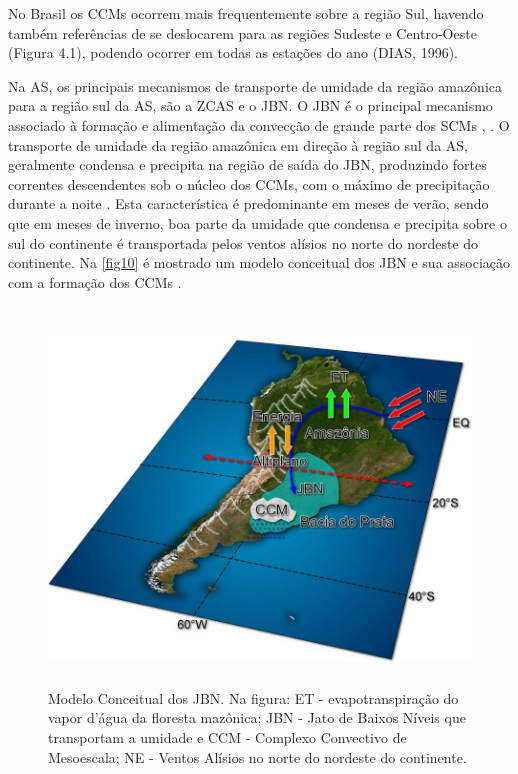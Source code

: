 No Brasil os CCMs ocorrem mais frequentemente sobre a região Sul, havendo também referências de se deslocarem para as regiões Sudeste e Centro-Oeste (Figura 4.1), podendo ocorrer em todas as estações do ano (DIAS, 1996).

Na AS, os principais mecanismos de transporte de umidade da região amazônica para a região sul da AS, são a ZCAS e o JBN. O JBN é o principal mecanismo associado à formação e alimentação da convecção de grande parte dos SCMs \cite{ferreiraetal03}, \cite{herdiesetal02}. O transporte de umidade da região amazônica em direção à região sul da AS, geralmente condensa e precipita na região de saída do JBN, produzindo fortes correntes descendentes sob o núcleo dos CCMs, com o máximo de precipitação durante a noite \cite{noguespaegleberbery00}. Esta característica é predominante em meses de verão, sendo que em meses de inverno, boa parte da umidade que condensa e precipita sobre o sul do continente é transportada pelos ventos alísios no norte do nordeste do continente. Na \autoref{fig10} é mostrado um modelo conceitual dos JBN e sua associação com a formação dos CCMs \cite{marengoetal04}.

\begin{figure}
\includegraphics[height=10cm]{./figs/fig10.png}
\caption{Modelo Conceitual dos JBN. Na figura: ET - evapotranspiração do vapor d'água da floresta mazônica; JBN - Jato de Baixos Níveis que transportam a umidade e CCM - Complexo Convectivo de Mesoescala; NE - Ventos Alísios no norte do nordeste do continente.}
\label{fig05}
\end{figure}

